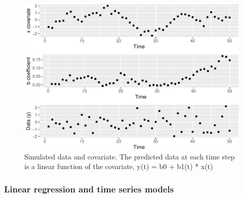 \documentclass[]{article}
\begin{document}
\begin{figure}
\centering
\includegraphics{univariate-time-series-examples_files/figure-latex/unnamed-chunk-1-1.pdf}
\caption{Simulated data and covariate. The predicted data at each time
step is a linear function of the covariate, y(t) = b0 + b1(t) * x(t)}
\end{figure}

\hypertarget{linear-regression-and-time-series-models}{%
\subsubsection{Linear regression and time series
models}\label{linear-regression-and-time-series-models}}
\end{document}
